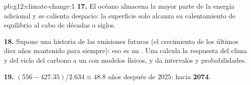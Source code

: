 \begin{solution}{pb:g12:climate-change:1}
\textbf{17.} El océano almacena la mayor parte de la energía adicional y se calienta despacio: la
superficie solo alcanza su calentamiento de equilibrio al cabo de décadas o siglos.

\textbf{18.} Supone una historia de las emisiones futuras (el crecimiento de los
últimos diez años mantenido para siempre): eso es un . Una  calcula la
respuesta del clima y del ciclo del carbono a un 
con modelos físicos, y da intervalos y probabilidades.

\textbf{19.} $(556 - 427.35)/2.634 \approx 48.8$ años después de 2025: hacia
\textbf{2074}.
\end{solution}
